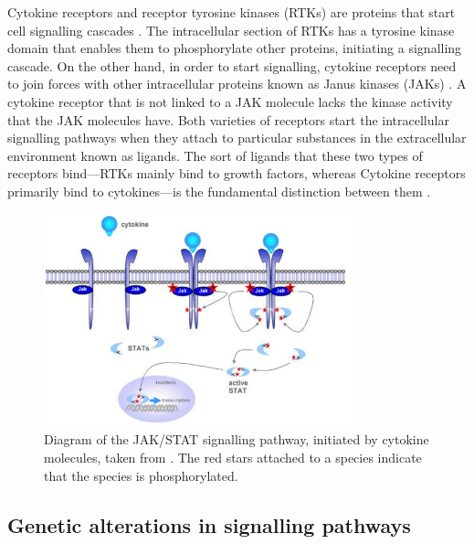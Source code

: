 Cytokine receptors and receptor tyrosine kinases (RTKs) are proteins that start cell signalling cascades \cite{kazi2014socs}. The intracellular section of RTKs has a tyrosine kinase domain that enables them to phosphorylate other proteins, initiating a signalling cascade. On the other hand, in order to start signalling, cytokine receptors need to join forces with other intracellular proteins known as Janus kinases (JAKs) \cite{gadina2013janus}. A cytokine receptor that is not linked to a JAK molecule lacks the kinase activity that the JAK molecules have. Both varieties of receptors start the intracellular signalling pathways when they attach to particular substances in the extracellular environment known as ligands. The sort of ligands that these two types of receptors bind—RTKs mainly bind to growth factors, whereas Cytokine receptors primarily bind to cytokines—is the fundamental distinction between them \cite{tamiya2011suppressors}.

 \begin{figure}[hbt!]
	\centering
	\begin{framed}
	\includegraphics[width=0.8\textwidth]{Figures/a.JPG}
		\end{framed}
	\caption{Diagram of the JAK/STAT signalling pathway, initiated by cytokine molecules, taken from \cite{haan2006jaks}. The red stars attached to a species indicate that the species is phosphorylated.}
	\label{fig:6}
\end{figure}

\subsection{Genetic alterations in signalling pathways}
\paragraph{}

